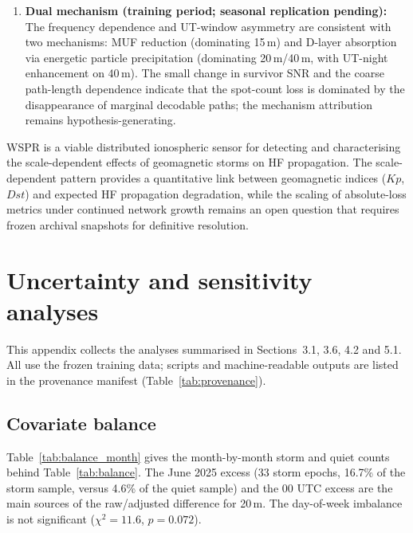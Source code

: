 \documentclass{agujournal2019}
\begin{document}
{\begin{enumerate}
	      but not conclusively established. Percentage drops remain the more
	      stable metric.
	\item \textbf{Dual mechanism (training period; seasonal replication
	      pending):} The frequency dependence and UT-window asymmetry are
	      consistent with two mechanisms: MUF reduction (dominating 15\,m)
	      and D-layer absorption via energetic particle precipitation
	      (dominating 20\,m/40\,m, with UT-night enhancement on 40\,m).
	      The small change in survivor SNR and the coarse path-length
	      dependence indicate that the spot-count loss is dominated by the
	      disappearance of marginal decodable paths; the mechanism
	      attribution remains hypothesis-generating.
\end{enumerate}
\par}

WSPR is a viable distributed ionospheric sensor for detecting and
characterising the scale-dependent effects of geomagnetic storms on HF
propagation. The scale-dependent pattern provides a quantitative
link between geomagnetic indices ($Kp$, $Dst$) and expected HF propagation
degradation, while the scaling of absolute-loss metrics under continued
network growth remains an open question that requires frozen archival
snapshots for definitive resolution.


\appendix
\section{Uncertainty and sensitivity analyses}
\label{app:sensitivity}

This appendix collects the analyses summarised in Sections~3.1, 3.6, 4.2
and 5.1. All use the frozen training data; scripts and machine-readable
outputs are listed in the provenance manifest (Table~\ref{tab:provenance}).

\subsection{Covariate balance}

Table~\ref{tab:balance_month} gives the month-by-month storm and quiet
counts behind Table~\ref{tab:balance}. The June 2025 excess (33 storm
epochs, 16.7\% of the storm sample, versus 4.6\% of the quiet sample) and
the 00 UTC excess are the main sources of the raw/adjusted difference for
20\,m. The day-of-week imbalance is not significant
($\chi^2 = 11.6$, $p = 0.072$).
\end{document}
